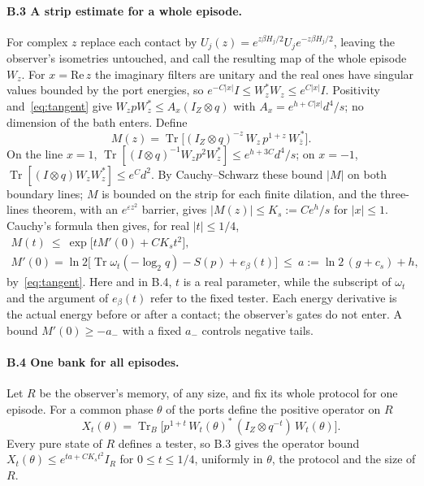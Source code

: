 \documentclass[11pt]{article}
\theoremstyle{definition}
\theoremstyle{remark}
\newcommand{\Tr}{\operatorname{Tr}}
\begin{document}
\paragraph{B.3 A strip estimate for a whole episode.} For complex $z$ replace each contact by $U_j(z)=e^{z\beta H_j/2}U_je^{-z\beta H_j/2}$, leaving the observer's isometries untouched, and call the resulting map of the whole episode $W_z$. For $x=\mathrm{Re}\,z$ the imaginary filters are unitary and the real ones have singular values bounded by the port energies, so $e^{-C|x|}I\le W_z^*W_z\le e^{C|x|}I$. Positivity and~\eqref{eq:tangent} give $W_zpW_z^*\le A_x(I_Z\otimes q)$ with $A_x=e^{h+C|x|}d^4/s$; no dimension of the bath enters. Define
\[
M(z)=\Tr\bigl[(I_Z\otimes q)^{-z}\,W_z\,p^{1+z}\,W_{\bar z}^{\,*}\bigr].
\]
On the line $x=1$, $\Tr[(I\otimes q)^{-1}W_zp^2W_z^*]\le e^{h+3C}d^4/s$; on $x=-1$, $\Tr[(I\otimes q)W_zW_z^*]\le e^Cd^2$. By Cauchy--Schwarz these bound $|M|$ on both boundary lines; $M$ is bounded on the strip for each finite dilation, and the three-lines theorem, with an $e^{\varepsilon z^2}$ barrier, gives $|M(z)|\le K_s:=Ce^h/s$ for $|x|\le1$. Cauchy's formula then gives, for real $|t|\le1/4$,
\[
\begin{gathered}
M(t)\ \le\ \exp\bigl[tM'(0)+CK_st^2\bigr],\\
M'(0)=\ln2\bigl[\Tr\omega_t(-\log_2q)-S(p)+e_\beta(t)\bigr]\ \le\ a:=\ln2\,(g+c_s)+h,
\end{gathered}
\]
by~\eqref{eq:tangent}. Here and in B.4, $t$ is a real parameter, while the subscript of $\omega_t$ and the argument of $e_\beta(t)$ refer to the fixed tester. Each energy derivative is the actual energy before or after a contact; the observer's gates do not enter. A bound $M'(0)\ge-a_-$ with a fixed $a_-$ controls negative tails.

\paragraph{B.4 One bank for all episodes.} Let $R$ be the observer's memory, of any size, and fix its whole protocol for one episode. For a common phase $\theta$ of the ports define the positive operator on $R$
\[
X_t(\theta)=\Tr_B\bigl[p^{1+t}\,W_t(\theta)^*\,(I_Z\otimes q^{-t})\,W_t(\theta)\bigr].
\]
Every pure state of $R$ defines a tester, so B.3 gives the operator bound $X_t(\theta)\le e^{ta+CK_st^2}I_R$ for $0\le t\le1/4$, uniformly in $\theta$, the protocol and the size of $R$.
\end{document}
